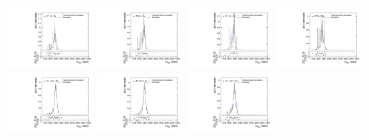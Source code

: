 \begin{figure}[htpb]
  \centering
  \includegraphics[width=0.2\textwidth]{fig/analysisAppendix/templateVsReco_WprToWZ2000_r0_MVV_mu_HP_bb_LDy_linear.pdf}
  \includegraphics[width=0.2\textwidth]{fig/analysisAppendix/templateVsReco_WprToWZ2000_r0_MVV_mu_LP_bb_LDy_linear.pdf}
  \includegraphics[width=0.2\textwidth]{fig/analysisAppendix/templateVsReco_WprToWZ2000_r0_MVV_mu_HP_bb_HDy_linear.pdf}
  \includegraphics[width=0.2\textwidth]{fig/analysisAppendix/templateVsReco_WprToWZ2000_r0_MVV_mu_LP_bb_HDy_linear.pdf}\\
  \includegraphics[width=0.2\textwidth]{fig/analysisAppendix/templateVsReco_WprToWZ2000_r0_MVV_mu_HP_nobb_LDy_linear.pdf}
  \includegraphics[width=0.2\textwidth]{fig/analysisAppendix/templateVsReco_WprToWZ2000_r0_MVV_mu_LP_nobb_LDy_linear.pdf}
  \includegraphics[width=0.2\textwidth]{fig/analysisAppendix/templateVsReco_WprToWZ2000_r0_MVV_mu_HP_nobb_HDy_linear.pdf}

\end{figure}
